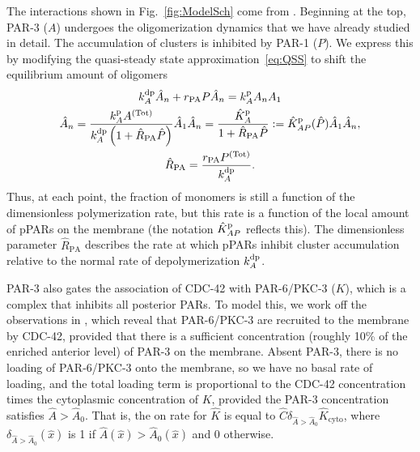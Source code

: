 \documentclass[11pt]{article}
\newcommand{\6}[1]{#1_{\text{6}}}
\newcommand{\3}[1]{#1_{\text{3}}}
\newcommand{\Tot}[1]{#1^\text{(Tot)}}
\begin{document}
The interactions shown in Fig.\ \ref{fig:ModelSch} come from \cite[Fig.~2]{lang2017proteins}. Beginning at the top, PAR-3 ($A$) undergoes the oligomerization dynamics that we have already studied in detail. The accumulation of clusters is inhibited by PAR-1 ($P$). We express this by modifying the quasi-steady state approximation\ \eqref{eq:QSS} to shift the equilibrium amount of oligomers
\begin{subequations}
\begin{gather}
\kdp_A \hat A_n +r_\text{PA} P \hat A_n = \kp_A A_n A_1\\
\label{eq:QSSP}
\hat A_n = \frac{\kp_A \Tot{A}}{\kdp_A\left(1+\hat R_\text{PA} \hat P\right)} \hat A_1 \hat A_n =\frac{\KhatpA}{1+\hat R_\text{PA} \hat P}:=\KhatpAP (\hat P )\hat A_1 \hat A_n,\\
\hat R_\text{PA} = \frac{r_\text{PA}\Tot{P}}{\kdp_A}. 
\end{gather}
\end{subequations}
Thus, at each point, the fraction of monomers is still a function of the dimensionless polymerization rate, but this rate is a function of the local amount of pPARs on the membrane (the notation $\hat{K}^\text{p}_{AP}$ reflects this). The dimensionless parameter $\hat R_\text{PA}$ describes the rate at which pPARs inhibit cluster accumulation relative to the normal rate of depolymerization $k^\text{dp}_A$. 

PAR-3 also gates the association of CDC-42 with PAR-6/PKC-3 ($K$), which is a complex that inhibits all posterior PARs. To model this, we work off the observations in \cite{sailer2015dynamic}, which reveal that PAR-6/PKC-3 are recruited to the membrane by CDC-42, provided that there is a sufficient concentration (roughly 10\% of the enriched anterior level) of PAR-3 on the membrane. Absent PAR-3, there is no loading of PAR-6/PKC-3 onto the membrane, so we have no basal rate of loading, and the total loading term is proportional to the CDC-42 concentration times the cytoplasmic concentration of $K$, provided the PAR-3 concentration satisfies $\hat A > \hat A_0$. That is, the on rate for $\hat K$ is equal to $\hat{C} \delta_{\hat A > \hat A_0}\hat K_\text{cyto}$, where $\delta_{\hat A > \hat A_0}(\hat x)$ is 1 if $\hat A(\hat x) > \hat A_0(\hat x)$ and 0 otherwise. 
\end{document}
